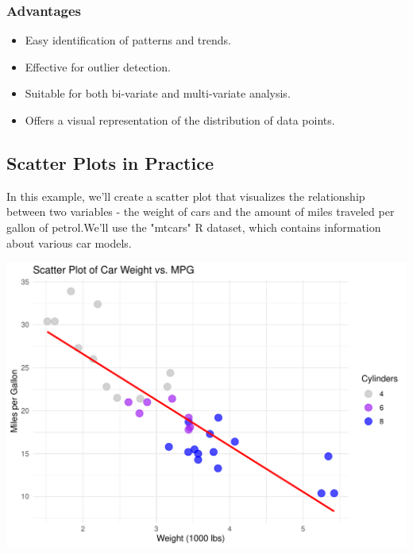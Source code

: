 \documentclass{article}\usepackage[]{graphicx}\usepackage[]{xcolor}
\makeatletter
\def\maxwidth{ %
  \ifdim\Gin@nat@width>\linewidth
    \linewidth
  \else
    \Gin@nat@width
  \fi
}
\newenvironment{kframe}{%
 \def\at@end@of@kframe{}%
 \ifinner\ifhmode%
  \def\at@end@of@kframe{\end{minipage}}%
  \begin{minipage}{\columnwidth}%
 \fi\fi%
 \def\FrameCommand##1{\hskip\@totalleftmargin \hskip-\fboxsep
 \colorbox{shadecolor}{##1}\hskip-\fboxsep
     \hskip-\linewidth \hskip-\@totalleftmargin \hskip\columnwidth}%
 \MakeFramed {\advance\hsize-\width
   \@totalleftmargin\z@ \linewidth\hsize
   \@setminipage}}%
 {\par\unskip\endMakeFramed%
 \at@end@of@kframe}
\newenvironment{knitrout}{}{} %
\makeatother
\begin{document}
\subsubsection{Advantages}
\begin{itemize}
    \item Easy identification of patterns and trends. 
    \item Effective for outlier detection. 
    \item Suitable for both bi-variate and multi-variate analysis.
    \item Offers a visual representation of the distribution of data points.
\end{itemize}

\subsection{Scatter Plots in Practice}
In this example, we'll create a scatter plot that visualizes the relationship between two variables - the weight of cars and the amount of miles traveled per gallon of petrol.We'll use the "mtcars" R dataset, which contains information about various car models.

\begin{knitrout}
\color{fgcolor}\begin{kframe}


{\ttfamily\noindent\itshape{}}\end{kframe}
\includegraphics[width=\maxwidth]{figure/scatter-plot-chunk-1} 
\end{knitrout}
\end{document}
